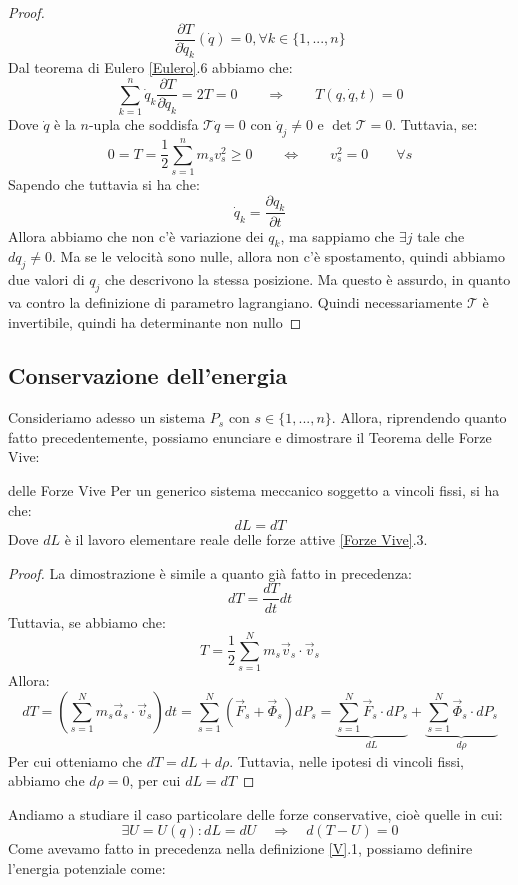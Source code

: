 \documentclass[11pt,a4paper,twoside]{article}
\theoremstyle{definition}
\begin{document}
\begin{proof}
	\[\frac{\partial T}{\partial \dot q_k} (\dot q) = 0, \forall k \in \{1,...,n\}\]
	Dal teorema di Eulero \ref{Eulero}.6 abbiamo che:
	\[ \sum_{k=1}^n \dot q_k \frac{\partial T}{\partial \dot q_k} = 2T = 0 \qquad \Rightarrow \qquad T(q, \dot q, t)=0\]
	Dove $\dot q$ è la $n$-upla che soddisfa $\mathscr T \dot q =0$ con $\dot q_j \neq 0$ e $\det \mathscr T =0$. Tuttavia, se:
	\[ 0 = T = \frac 12 \sum_{s=1}^n m_s v_s^2 \geq 0 \qquad \Leftrightarrow \qquad v_s^2 = 0 \qquad \forall s \]
	Sapendo che tuttavia si ha che:
	\[ \dot q_k = \frac{\partial q_k}{\partial t} \]
	Allora abbiamo che non c'è variazione dei $q_k$, ma sappiamo che $\exists j$ tale che $dq_j \neq 0$. Ma se le velocità sono nulle, allora non c'è spostamento, quindi abbiamo due valori di $q_j$ che descrivono la stessa posizione. Ma questo è assurdo, in quanto va contro la definizione di parametro lagrangiano. Quindi necessariamente $\mathscr T$ è invertibile, quindi ha determinante non nullo
\end{proof}

\subsection{Conservazione dell'energia}

Consideriamo adesso un sistema $P_s$ con $s \in \{1,...,n\}$. Allora, riprendendo quanto fatto precedentemente, possiamo enunciare e dimostrare il Teorema delle Forze Vive:

\begin{thm}{delle Forze Vive}{}
	Per un generico sistema meccanico soggetto a vincoli fissi, si ha che:
	\[ dL = dT \]
	Dove $dL$ è il lavoro elementare reale delle forze attive \ref{Forze Vive}.3.
\end{thm}
\begin{proof}
	La dimostrazione è simile a quanto già fatto in precedenza:
	\[ dT = \frac{dT}{dt}dt \]
	Tuttavia, se abbiamo che:
	\[ T = \frac 12 \sum_{s = 1}^N m_s \vec v_s \cdot \vec v_s \]
	Allora:
	\[ dT = \left( \sum_{s=1}^N m_s\vec a_s \cdot \vec v_s \right)dt = \sum_{s=1}^N \left(\vec F_s + \vec \Phi_s\right) dP_s = \underbrace{\sum_{s=1}^N \vec F_s \cdot dP_s}_{dL} + \underbrace{\sum_{s=1}^N \vec \Phi_s \cdot dP_s}_{d \rho} \]
	Per cui otteniamo che $dT = dL + d\rho$. Tuttavia, nelle ipotesi di vincoli fissi, abbiamo che $d \rho=0$, per cui $dL = dT$
\end{proof}

Andiamo a studiare il caso particolare delle forze conservative, cioè quelle in cui:
\[ \exists U = U(q): dL = dU \quad \Rightarrow \quad d(T-U) = 0\]
Come avevamo fatto in precedenza nella definizione \ref{V}.1, possiamo definire l'energia potenziale come:
\end{document}
